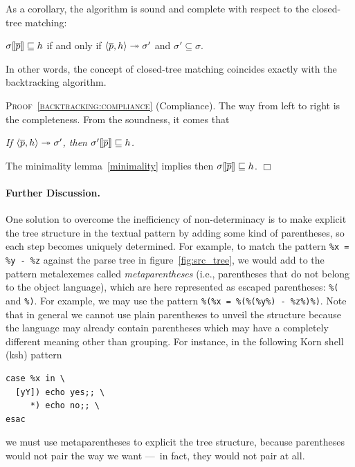 As a corollary, the algorithm is sound and complete with respect to
the closed\hyp{}tree matching:
\begin{corollary}[Compliance]\hfill
\label{backtracking:compliance}
\begin{center}
\(\subst{\overline{p}}{\sigma} \sqsubseteq h\) if and only if
\(\smat{h}{\overline{p}} \twoheadrightarrow \sigma'\)
and  \(\sigma' \subseteq \sigma\).
\end{center}
\end{corollary}
\noindent In other words, the concept of closed\hyp{}tree matching
coincides exactly with the backtracking algorithm.

\medskip

\noindent\textsc{Proof~\ref{backtracking:compliance}}
(Compliance). The way from left to right is the completeness. From the
soundness, it comes that
\begin{center}\it
If \(\smat{h}{\overline{p}} \twoheadrightarrow \sigma'\), then
\(\subst{\overline{p}}{\sigma'} \sqsubseteq h\).
\end{center}
The minimality lemma~\ref{minimality} implies then
\(\subst{\overline{p}}{\sigma} \sqsubseteq h\). \(\Box\)

\paragraph{Further Discussion.}

One solution to overcome the inefficiency of non\hyp{}determinacy is
to make explicit the tree structure in the textual pattern by adding
some kind of parentheses, so each step becomes uniquely
determined. For example, to match the pattern \texttt{\%x = \%y - \%z}
against the parse tree in figure~\ref{fig:src_tree}, we would add to
the pattern meta\-lexemes called \emph{meta\-parentheses} (i.e.,
parentheses that do not belong to the object language), which are here
represented as escaped parentheses: \texttt{\%(} and \texttt{\%)}. For
example, we may use the pattern \texttt{\%(\%x = \%(\%(\%y\%) -
\%z\%)\%)}. Note that in general we cannot use plain parentheses to
unveil the structure because the language may already contain
parentheses which may have a completely different meaning other than
grouping. For instance, in the following \textsf{Korn shell}
(\textsf{ksh}) pattern
{\small
\begin{verbatim}
case %x in \
  [yY]) echo yes;; \
     *) echo no;; \
esac
\end{verbatim}
}
\noindent we must use meta\-parentheses to explicit the tree
structure, because parentheses would not pair the way we want ---~in
fact, they would not pair at all.

